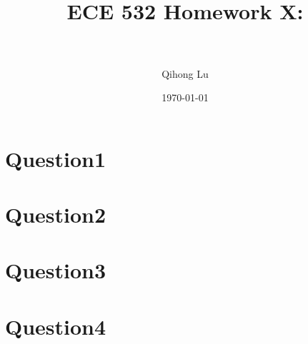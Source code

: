 \documentclass[paper=a4, fontsize=11pt]{scrartcl} %
\title{	
\normalfont \normalsize 
\horrule{0.5pt} \\[0.4cm] %
\huge ECE 532 Homework X:\\ %
\horrule{2pt} \\[0.5cm] %
}
\author{Qihong Lu} %
\date{\normalsize\today} %
\numberwithin{equation}{section} %
\numberwithin{figure}{section} %
\numberwithin{table}{section} %
\begin{document}
\maketitle %


\section*{Question1}




\section*{Question2}



\section*{Question3}


\section*{Question4}
\end{document}
